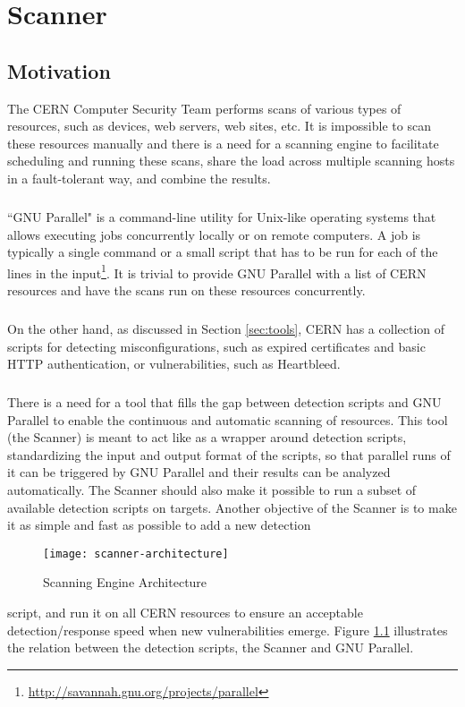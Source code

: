 \chapter{Scanner}
\label{scanner}
\thispagestyle{empty}

\section{Motivation}
\label{scanner_motivation}
The CERN Computer Security Team performs scans of various types of resources, such as devices, web servers, web sites, etc. It is impossible to scan these resources manually and there is a need for a scanning engine to facilitate scheduling and running these scans, share the load across multiple scanning hosts in a fault-tolerant way, and combine the results.
\paragraph{}
``GNU Parallel" is a command-line utility for Unix-like operating systems that allows executing jobs concurrently locally or on remote computers. A job is typically a single command or a small script that has to be run for each of the lines in the input\footnote{\url{http://savannah.gnu.org/projects/parallel}}. It is trivial to provide GNU Parallel with a list of CERN resources and have the scans run on these resources concurrently.
\paragraph{}
On the other hand, as discussed in Section \ref{sec:tools}, CERN has a collection of scripts for detecting misconfigurations, such as expired certificates and basic HTTP authentication, or vulnerabilities, such as Heartbleed. 
\paragraph{}
There is a need for a tool that fills the gap between detection scripts and GNU Parallel to enable the continuous and automatic scanning of resources. This tool (the Scanner) is meant to act like as a wrapper around detection scripts, standardizing the input and output format of the scripts, so that parallel runs of it can be triggered by GNU Parallel and their results can be analyzed automatically. The Scanner should also make it possible to run a subset of available detection scripts on targets. Another objective of the Scanner is to make it as simple and fast as possible to add a new detection
\begin{figure}[H]

  \centering
    \texttt{[image: scanner-architecture]}
  \caption{Scanning Engine Architecture}
\label{figure:scanner-arch}
\end{figure}
\noindent
script, and run it on all CERN resources to ensure an acceptable detection/response speed when new vulnerabilities emerge. Figure \ref{figure:scanner-arch} illustrates the relation between the detection scripts, the Scanner and GNU Parallel. 




